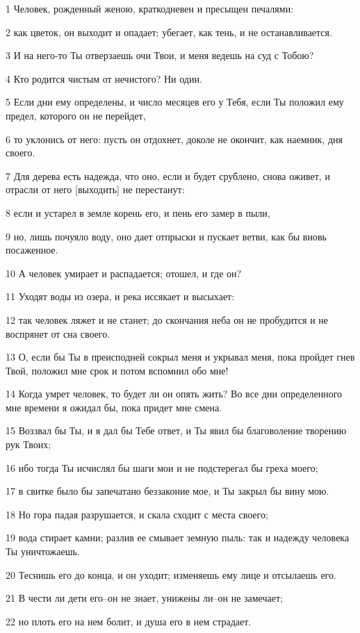 \par 1 Человек, рожденный женою, краткодневен и пресыщен печалями:
\par 2 как цветок, он выходит и опадает; убегает, как тень, и не останавливается.
\par 3 И на него-то Ты отверзаешь очи Твои, и меня ведешь на суд с Тобою?
\par 4 Кто родится чистым от нечистого? Ни один.
\par 5 Если дни ему определены, и число месяцев его у Тебя, если Ты положил ему предел, которого он не перейдет,
\par 6 то уклонись от него: пусть он отдохнет, доколе не окончит, как наемник, дня своего.
\par 7 Для дерева есть надежда, что оно, если и будет срублено, снова оживет, и отрасли от него [выходить] не перестанут:
\par 8 если и устарел в земле корень его, и пень его замер в пыли,
\par 9 но, лишь почуяло воду, оно дает отпрыски и пускает ветви, как бы вновь посаженное.
\par 10 А человек умирает и распадается; отошел, и где он?
\par 11 Уходят воды из озера, и река иссякает и высыхает:
\par 12 так человек ляжет и не станет; до скончания неба он не пробудится и не воспрянет от сна своего.
\par 13 О, если бы Ты в преисподней сокрыл меня и укрывал меня, пока пройдет гнев Твой, положил мне срок и потом вспомнил обо мне!
\par 14 Когда умрет человек, то будет ли он опять жить? Во все дни определенного мне времени я ожидал бы, пока придет мне смена.
\par 15 Воззвал бы Ты, и я дал бы Тебе ответ, и Ты явил бы благоволение творению рук Твоих;
\par 16 ибо тогда Ты исчислял бы шаги мои и не подстерегал бы греха моего;
\par 17 в свитке было бы запечатано беззаконие мое, и Ты закрыл бы вину мою.
\par 18 Но гора падая разрушается, и скала сходит с места своего;
\par 19 вода стирает камни; разлив ее смывает земную пыль: так и надежду человека Ты уничтожаешь.
\par 20 Теснишь его до конца, и он уходит; изменяешь ему лице и отсылаешь его.
\par 21 В чести ли дети его--он не знает, унижены ли--он не замечает;
\par 22 но плоть его на нем болит, и душа его в нем страдает.

